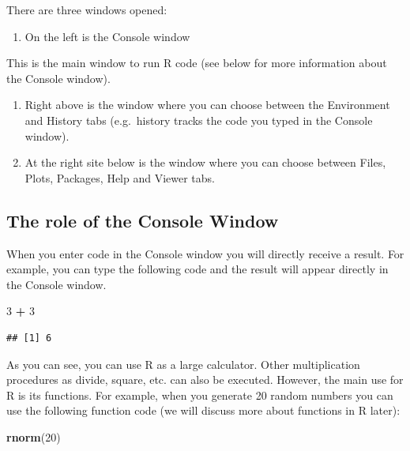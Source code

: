 \documentclass[]{book}
\newenvironment{Shaded}{\begin{snugshade}}{\end{snugshade}}
\newcommand{\KeywordTok}[1]{\textcolor[rgb]{0.13,0.29,0.53}{\textbf{#1}}}
\newcommand{\DecValTok}[1]{\textcolor[rgb]{0.00,0.00,0.81}{#1}}
\newcommand{\StringTok}[1]{\textcolor[rgb]{0.31,0.60,0.02}{#1}}
\newcommand{\OperatorTok}[1]{\textcolor[rgb]{0.81,0.36,0.00}{\textbf{#1}}}
\newcommand{\NormalTok}[1]{#1}
\providecommand{\tightlist}{%
  \setlength{\itemsep}{0pt}\setlength{\parskip}{0pt}}
\begin{document}
There are three windows opened:

\begin{enumerate}
\def\labelenumi{\arabic{enumi}.}
\tightlist
\item
  On the left is the Console window
\end{enumerate}

This is the main window to run R code (see below for more information
about the Console window).

\begin{enumerate}
\def\labelenumi{\arabic{enumi}.}
\setcounter{enumi}{1}
\tightlist
\item
  Right above is the window where you can choose between the Environment
  and History tabs (e.g.~history tracks the code you typed in the
  Console window).
\item
  At the right site below is the window where you can choose between
  Files, Plots, Packages, Help and Viewer tabs.
\end{enumerate}

\subsection{The role of the Console
Window}\label{the-role-of-the-console-window}

When you enter code in the Console window you will directly receive a
result. For example, you can type the following code and the result will
appear directly in the Console window.

\begin{Shaded}
\begin{Highlighting}[]
\DecValTok{3} \OperatorTok{+}\StringTok{ }\DecValTok{3}
\end{Highlighting}
\end{Shaded}

\begin{verbatim}
## [1] 6
\end{verbatim}

As you can see, you can use R as a large calculator. Other
multiplication procedures as divide, square, etc. can also be executed.
However, the main use for R is its functions. For example, when you
generate 20 random numbers you can use the following function code (we
will discuss more about functions in R later):

\begin{Shaded}
\begin{Highlighting}[]
\KeywordTok{rnorm}\NormalTok{(}\DecValTok{20}\NormalTok{)}
\end{Highlighting}
\end{Shaded}
\end{document}
